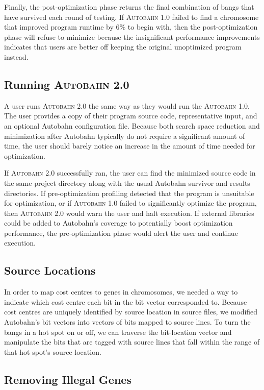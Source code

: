 \documentclass[format=sigplan]{acmart}
\newcommand{\hotspot}[0]{hot spot}
\newcommand{\Ao}[0]{\textsc{Autobahn 1.0}}
\newcommand{\At}[0]{\textsc{Autobahn 2.0}}
\newcommand{\preopt}[0]{pre-optimization}
\newcommand{\postopt}[0]{post-optimization}
\begin{document}
Finally, the \postopt{} phase returns the final combination of bangs that have survived each round of testing. If \Ao{} failed to find a chromosome that improved program runtime by 6\% to begin with, then the \postopt{} phase will refuse to minimize because the insignificant performance improvements indicates that users are better off keeping the original unoptimized program instead.


\subsection{Running \At{}}

A user runs \At{} the same way as they would run the \Ao{}. The user provides a copy of their program source code, representative input, and an optional Autobahn configuration file. Because both search space reduction and minimization after Autobahn typically do not require a significant amount of time, the user should barely notice an increase in the amount of time needed for optimization. 

If \At{} successfully ran, the user can find the minimized source code in the same project directory along with the usual Autobahn survivor and results directories. If \preopt{} profiling detected that the program is unsuitable for optimization, or if \Ao{} failed to significantly optimize the program, then \At{} would warn the user and halt execution. If external libraries could be added to Autobahn's coverage to potentially boost optimization performance, the \preopt{} phase would alert the user and continue execution.

\subsection{Source Locations}

In order to map cost centres to genes in chromosomes, we needed a way to indicate which cost centre each bit in the bit vector corresponded to. Because cost centres are uniquely identified by source location in source files, we modified Autobahn's bit vectors into vectors of bits mapped to source lines. To turn the bangs in a \hotspot{} on or off, we can traverse the bit-location vector and manipulate the bits that are tagged with source lines that fall within the range of that \hotspot{}'s source location.

\subsection{Removing Illegal Genes}
\end{document}
